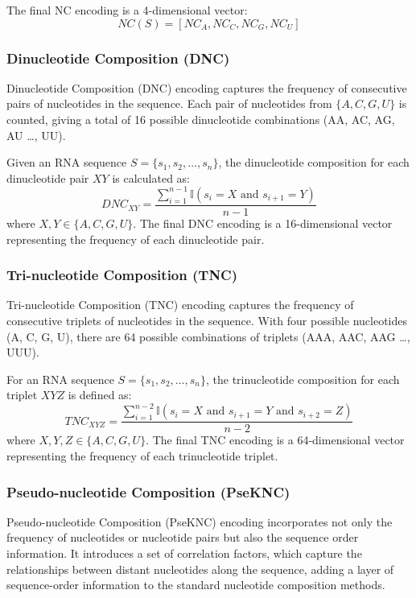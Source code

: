       The final NC encoding is a 4-dimensional vector:
      \[
        NC(S) = [NC_A, NC_C, NC_G, NC_U]
      \]

    \subsubsection{Dinucleotide Composition (DNC)}\label{subsubsec:dnc}
      Dinucleotide Composition (DNC) encoding captures the frequency of consecutive pairs of nucleotides in the sequence.
      Each pair of nucleotides from $\{A, C, G, U\}$ is counted, giving a total of 16 possible dinucleotide combinations (AA, AC, AG, AU \dots, UU).

      Given an RNA sequence $S = \{s_1, s_2, \dots, s_n\}$, the dinucleotide composition for each dinucleotide pair $XY$ is calculated as:
      \[
        DNC_{XY} = \frac{\sum_{i=1}^{n-1} \mathbb{I}(s_i = X \text{ and } s_{i+1} = Y)}{n-1}
      \]
      where $X, Y \in \{A, C, G, U\}$.
      The final DNC encoding is a 16-dimensional vector representing the frequency of each dinucleotide pair.

    \subsubsection{Tri-nucleotide Composition (TNC)}\label{subsubsec:tnc}
      Tri-nucleotide Composition (TNC) encoding captures the frequency of consecutive triplets of nucleotides in the sequence.
      With four possible nucleotides (A, C, G, U), there are 64 possible combinations of triplets (AAA, AAC, AAG \dots, UUU).

      For an RNA sequence $S = \{s_1, s_2, \dots, s_n\}$, the trinucleotide composition for each triplet $XYZ$ is defined as:
      \[
        TNC_{XYZ} = \frac{\sum_{i=1}^{n-2} \mathbb{I}(s_i = X \text{ and } s_{i+1} = Y \text{ and } s_{i+2} = Z)}{n-2}
      \]
      where $X, Y, Z \in \{A, C, G, U\}$.
      The final TNC encoding is a 64-dimensional vector representing the frequency of each trinucleotide triplet.

    \subsubsection{Pseudo-nucleotide Composition (PseKNC)}\label{subsubsec:pseknc}
      Pseudo-nucleotide Composition (PseKNC) encoding incorporates not only the frequency of nucleotides or nucleotide pairs but also the sequence order information.
      It introduces a set of correlation factors, which capture the relationships between distant nucleotides along the sequence, adding a layer of sequence-order information to the standard nucleotide composition methods.

